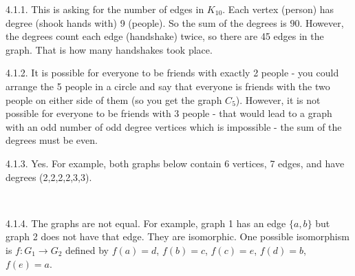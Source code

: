  \protect {} \protect \begin {itemize} 
\begin{ans}{4.1.1.}
		This is asking for the number of edges in $K_{10}$.  Each vertex (person) has degree (shook hands with) 9 (people).  So the sum of the degrees is $90$.  However, the degrees count each edge (handshake) twice, so there are 45 edges in the graph.  That is how many handshakes took place.%
	
\end{ans}
\begin{ans}{4.1.2.}
		It is possible for everyone to be friends with exactly 2 people - you could arrange the 5 people in a circle and say that everyone is friends with the two people on either side of them (so you get the graph $C_5$).  However, it is not possible for everyone to be friends with 3 people - that would lead to a graph with an odd number of odd degree vertices which is impossible - the sum of the degrees must be even.  %
	
\end{ans}
\begin{ans}{4.1.3.}
		Yes.  For example, both graphs below contain 6 vertices, 7 edges, and have degrees (2,2,2,2,3,3).
		\begin{center}
		  \hfill
		  \hfill
		  \hfill ~
		\end{center}
	
\end{ans}
\begin{ans}{4.1.4.}
		The graphs are not equal.  For example, graph 1 has an edge $\{a,b\}$ but graph 2 does not have that edge.  They are isomorphic.  One possible isomorphism is $f:G_1 \to G_2$ defined by $f(a) = d$, $f(b) = c$, $f(c) = e$, $f(d) = b$, $f(e) = a$.
	

\end{ans}
\end{itemize}

